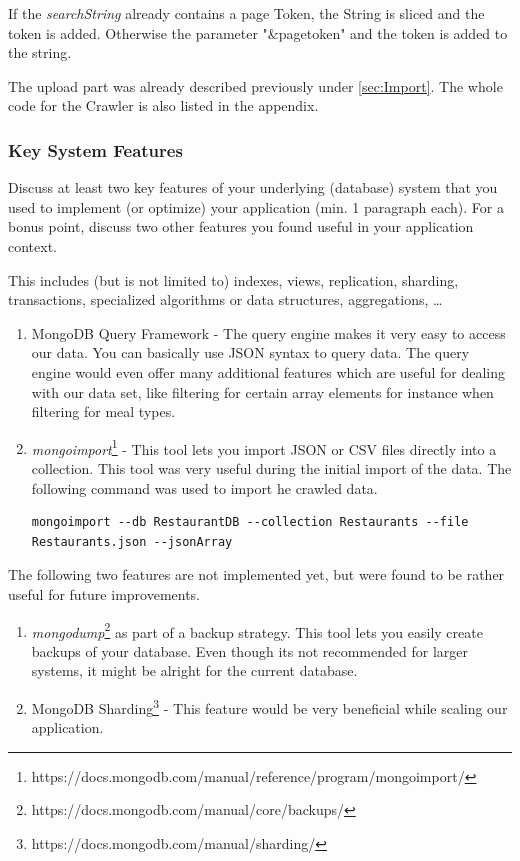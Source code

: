 If the \textit{searchString} already contains a page Token, the String is sliced and the token is added. Otherwise the parameter "\&pagetoken" and the token is added to the string.

The upload part was already described previously under \ref{sec:Import}. The whole code for the Crawler is also listed in the appendix.

\subsubsection{Key System Features}

Discuss at least two key features of your underlying (database) system that you
used to implement (or optimize) your application (min. 1 paragraph each). For
a bonus point, discuss two other features you found useful in your application
context.

This includes (but is not limited to) indexes, views, replication, sharding,
transactions, specialized algorithms or data structures, aggregations, \ldots

\begin{enumerate}
	\item MongoDB Query Framework - The query engine makes it very easy to access our data. You can basically use JSON syntax to query data. The query engine would even offer many additional features which are useful for dealing with our data set, like filtering for certain array elements for instance when filtering for meal types.
	\item \textit{mongoimport}\footnote{https://docs.mongodb.com/manual/reference/program/mongoimport/} - This tool lets you import JSON or CSV files directly into a collection. This tool was very useful during the initial import of the data. The following command was used to import he crawled data.
\begin{lstlisting}
mongoimport --db RestaurantDB --collection Restaurants --file Restaurants.json --jsonArray
\end{lstlisting}
\end{enumerate}
The following two features are not implemented yet, but were found to be rather useful for future improvements.
\begin{enumerate}
	\item \textit{mongodump}\footnote{https://docs.mongodb.com/manual/core/backups/} as part of a backup strategy. This tool lets you easily create backups of your database. Even though its not recommended for larger systems, it might be alright for the current database.
	\item MongoDB Sharding\footnote{https://docs.mongodb.com/manual/sharding/} - This feature would be very beneficial while scaling our application.  
\end{enumerate}

